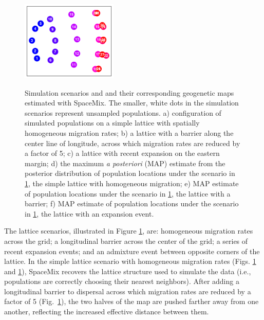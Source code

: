 \documentclass[12pt]{article}
\begin{document}
\begin{figure}
			{\includegraphics[width=1.8in,height=1.5in]{figs/sims/GeoGenMap_expansion.pdf}}

	\caption{
    Simulation scenarios and and their corresponding geogenetic maps estimated with SpaceMix.  
    The smaller, white dots in the simulation scenarios represent unsampled populations.  
    a) configuration of simulated populations on a simple lattice with spatially homogeneous migration rates; 
    b) a lattice with a barrier along the center line of longitude, across which migration rates are reduced by a factor of 5; 
    c) a lattice with recent expansion on the eastern margin; 
    d) the maximum \textit{a posteriori} (MAP) estimate from the posterior distribution of population locations under the scenario in \ref{sfig:lattice_scenarios}, the simple lattice with homogeneous migration;  
    e) MAP estimate of population locations under the scenario in \ref{sfig:lattice_scenarios}, the lattice with a barrier; 
    f) MAP estimate of population locations under the scenario in \ref{sfig:lattice_scenarios}, the lattice with an expansion event.
    }\label{sfig:lattice_scenarios}
\end{figure}

The lattice scenarios, illustrated in Figure \ref{sfig:lattice_scenarios}, are: homogeneous migration rates across the grid; a longitudinal barrier across the center of the grid; a series of recent expansion events; and an admixture event between opposite corners of the lattice.  In the simple lattice scenario with homogeneous migration rates (Figs. \ref{sfig:lattice_scenarios} and \ref{sfig:lattice_scenarios}), SpaceMix recovers the lattice structure used to simulate the data (i.e., populations are correctly choosing their nearest neighbors).  
After adding a longitudinal barrier to dispersal across which migration rates are reduced by a factor of 5 (Fig.\ \ref{sfig:lattice_scenarios}), 
the two halves of the map are pushed farther away from one another, 
reflecting the increased effective distance between them.
\end{document}
